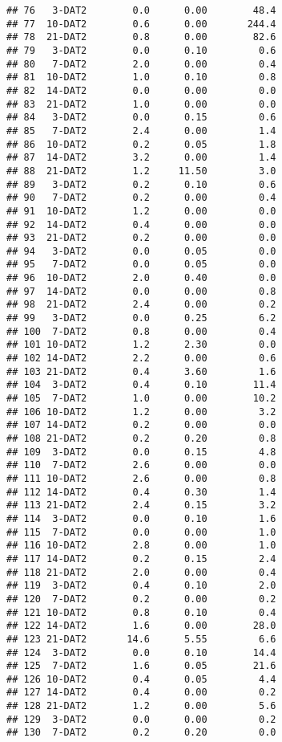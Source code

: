 \documentclass[
]{article}
\begin{document}
\begin{verbatim}
## 76   3-DAT2        0.0      0.00        48.4
## 77  10-DAT2        0.6      0.00       244.4
## 78  21-DAT2        0.8      0.00        82.6
## 79   3-DAT2        0.0      0.10         0.6
## 80   7-DAT2        2.0      0.00         0.4
## 81  10-DAT2        1.0      0.10         0.8
## 82  14-DAT2        0.0      0.00         0.0
## 83  21-DAT2        1.0      0.00         0.0
## 84   3-DAT2        0.0      0.15         0.6
## 85   7-DAT2        2.4      0.00         1.4
## 86  10-DAT2        0.2      0.05         1.8
## 87  14-DAT2        3.2      0.00         1.4
## 88  21-DAT2        1.2     11.50         3.0
## 89   3-DAT2        0.2      0.10         0.6
## 90   7-DAT2        0.2      0.00         0.4
## 91  10-DAT2        1.2      0.00         0.0
## 92  14-DAT2        0.4      0.00         0.0
## 93  21-DAT2        0.2      0.00         0.0
## 94   3-DAT2        0.0      0.05         0.0
## 95   7-DAT2        0.0      0.05         0.0
## 96  10-DAT2        2.0      0.40         0.0
## 97  14-DAT2        0.0      0.00         0.8
## 98  21-DAT2        2.4      0.00         0.2
## 99   3-DAT2        0.0      0.25         6.2
## 100  7-DAT2        0.8      0.00         0.4
## 101 10-DAT2        1.2      2.30         0.0
## 102 14-DAT2        2.2      0.00         0.6
## 103 21-DAT2        0.4      3.60         1.6
## 104  3-DAT2        0.4      0.10        11.4
## 105  7-DAT2        1.0      0.00        10.2
## 106 10-DAT2        1.2      0.00         3.2
## 107 14-DAT2        0.2      0.00         0.0
## 108 21-DAT2        0.2      0.20         0.8
## 109  3-DAT2        0.0      0.15         4.8
## 110  7-DAT2        2.6      0.00         0.0
## 111 10-DAT2        2.6      0.00         0.8
## 112 14-DAT2        0.4      0.30         1.4
## 113 21-DAT2        2.4      0.15         3.2
## 114  3-DAT2        0.0      0.10         1.6
## 115  7-DAT2        0.0      0.00         1.0
## 116 10-DAT2        2.8      0.00         1.0
## 117 14-DAT2        0.2      0.15         2.4
## 118 21-DAT2        2.0      0.00         0.4
## 119  3-DAT2        0.4      0.10         2.0
## 120  7-DAT2        0.2      0.00         0.2
## 121 10-DAT2        0.8      0.10         0.4
## 122 14-DAT2        1.6      0.00        28.0
## 123 21-DAT2       14.6      5.55         6.6
## 124  3-DAT2        0.0      0.10        14.4
## 125  7-DAT2        1.6      0.05        21.6
## 126 10-DAT2        0.4      0.05         4.4
## 127 14-DAT2        0.4      0.00         0.2
## 128 21-DAT2        1.2      0.00         5.6
## 129  3-DAT2        0.0      0.00         0.2
## 130  7-DAT2        0.2      0.20         0.0

\end{verbatim}
\end{document}
